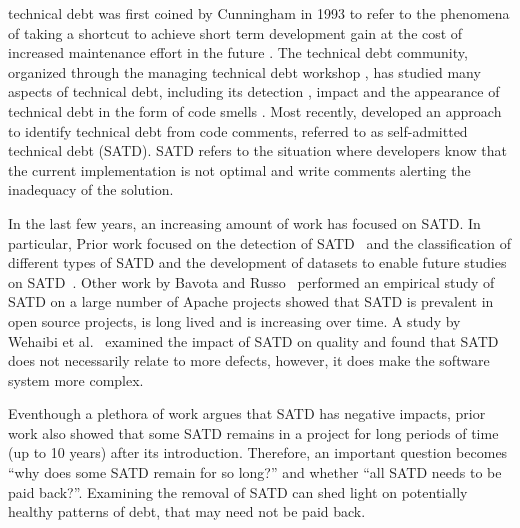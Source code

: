 
 technical debt was first coined by Cunningham in 1993 to refer to the phenomena of taking a shortcut to achieve short term development gain at the cost of increased maintenance effort in the future \cite{Cunningham1992WPM}. The technical debt community, organized through the managing technical debt workshop \cite{MTD2016}, has studied many aspects of technical debt, including its detection \cite{Zazworka2013EASE}, impact \cite{Zazworka2011MTD} and the appearance of technical debt in the form of code smells \cite{Fontana2012MTD}. Most recently,   developed an approach to identify technical debt from code comments, referred to as self-admitted technical debt (SATD). SATD refers to the situation where developers know that the current implementation is not optimal and write comments alerting the inadequacy of the solution. 


In the last few years, an increasing amount of work has focused on SATD. In particular,  Prior work focused on the detection of SATD~\cite{Potdar2014ICSME} and the classification of different types of SATD and the development of datasets to enable future studies on SATD~\cite{Maldonado2015MTD}. Other work by Bavota and Russo~\cite{Bavota2016MSR} performed an empirical study of SATD on a large number of Apache projects showed that SATD is prevalent in open source projects, is long lived and is increasing over time. A study by Wehaibi et al.~\cite{Wehaibi2016SANER} examined the impact of SATD on quality and found that SATD does not necessarily relate to more defects, however, it does make the software system more complex.

Eventhough a plethora of work argues that SATD has negative impacts, prior work also showed that some SATD remains in a project for long periods of time (up to 10 years) after its introduction. Therefore, an important question becomes ``why does some SATD remain for so long?'' and whether ``all SATD needs to be paid back?''. Examining the removal of SATD can shed light on potentially healthy patterns of debt, that may need not be paid back.

